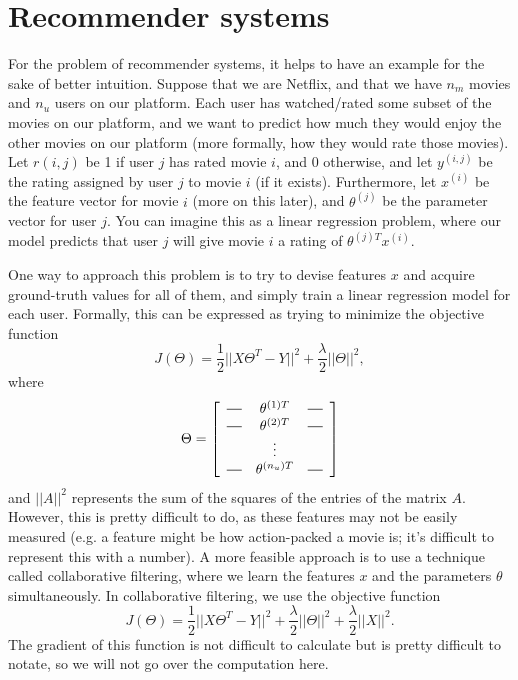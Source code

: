 \documentclass{article}
\newcommand*{\horzbar}{\rule[.5ex]{2.5ex}{0.5pt}}
\begin{document}
\section{Recommender systems}
For the problem of recommender systems, it helps to have an example for the sake of better intuition. Suppose that we are Netflix, and that we have $n_m$ movies and $n_u$ users on our platform. Each user has watched/rated some subset of the movies on our platform, and we want to predict how much they would enjoy the other movies on our platform (more formally, how they would rate those movies). Let $r(i, j)$ be 1 if user $j$ has rated movie $i$, and 0 otherwise, and let $y^{(i, j)}$ be the rating assigned by user $j$ to movie $i$ (if it exists). Furthermore, let $x^{(i)}$ be the feature vector for movie $i$ (more on this later), and $\theta^{(j)}$ be the parameter vector for user $j$. You can imagine this as a linear regression problem, where our model predicts that user $j$ will give movie $i$ a rating of $\theta^{(j)T}x^{(i)}$.

One way to approach this problem is to try to devise features $x$ and acquire ground-truth values for all of them, and simply train a linear regression model for each user. Formally, this can be expressed as trying to minimize the objective function
$$J(\Theta) = \frac{1}{2}||X\Theta^T - Y||^2 + \frac{\lambda}{2}||\Theta||^2,$$
where
$$\Theta = \left[
\begin{array}{ccc}
\horzbar & \theta^{(1)T} & \horzbar \\
\horzbar & \theta^{(2)T} & \horzbar \\
& \vdots & \\
\horzbar & \theta^{(n_u)T} & \horzbar \\
\end{array}
\right]$$
and $||A||^2$ represents the sum of the squares of the entries of the matrix $A$.
However, this is pretty difficult to do, as these features may not be easily measured (e.g. a feature might be how action-packed a movie is; it's difficult to represent this with a number). A more feasible approach is to use a technique called collaborative filtering, where we learn the features $x$ and the parameters $\theta$ simultaneously. In collaborative filtering, we use the objective function
$$J(\Theta) = \frac{1}{2}||X\Theta^T - Y||^2 + \frac{\lambda}{2}||\Theta||^2 + \frac{\lambda}{2}||X||^2.$$
The gradient of this function is not difficult to calculate but is pretty difficult to notate, so we will not go over the computation here.
\end{document}
